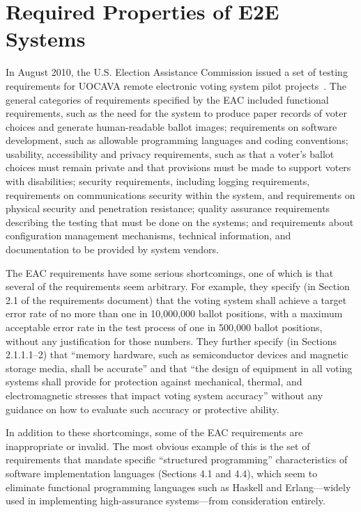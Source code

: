 \chapter{Required Properties of E2E Systems}
\label{chapter:required_properties}

In August 2010, the U.S. Election Assistance Commission issued a set
of testing requirements for UOCAVA remote electronic voting system
pilot projects~\cite{eac-uocava2010}. The general categories of
requirements specified by the EAC included functional requirements,
such as the need for the system to produce paper records of voter
choices and generate human-readable ballot images; requirements on
software development, such as allowable programming languages and
coding conventions; usability, accessibility and privacy requirements,
such as that a voter's ballot choices must remain private and that
provisions must be made to support voters with disabilities; security
requirements, including logging requirements, requirements on
communications security within the system, and requirements on
physical security and penetration resistance; quality assurance
requirements describing the testing that must be done on the systems;
and requirements about configuration management mechanisms, technical
information, and documentation to be provided by system vendors.

The EAC requirements have some serious shortcomings, one of which is
that several of the requirements seem arbitrary. For example, they
specify (in Section 2.1 of the requirements document) that the voting
system shall achieve a target error rate of no more than one in
10,000,000 ballot positions, with a maximum acceptable error rate in
the test process of one in 500,000 ballot positions, without any
justification for those numbers. They further specify (in Sections
2.1.1.1--2) that ``memory hardware, such as semiconductor devices and
magnetic storage media, shall be accurate'' and that ``the design of
equipment in all voting systems shall provide for protection against
mechanical, thermal, and electromagnetic stresses that impact voting
system accuracy'' without any guidance on how to evaluate such
accuracy or protective ability.

In addition to these shortcomings, some of the EAC requirements are
inappropriate or invalid. The most obvious example of this is the set
of requirements that mandate specific ``structured programming''
characteristics of software implementation languages (Sections 4.1 and
4.4), which seem to eliminate functional programming languages such as
Haskell and Erlang---widely used in implementing high-assurance
systems---from consideration entirely.

